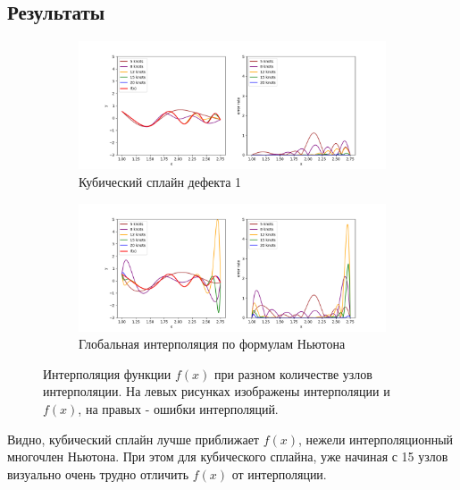 \documentclass[12pt]{article}%
\begin{document}
\newpage
\subsection{Результаты}
\begin{figure}[!h]
\centering
\begin{subfigure}{0.99\textwidth}
    \includegraphics[width=\textwidth]{task4_cubic-interp.png}
    \caption{Кубический сплайн дефекта 1}
\end{subfigure}
\hfill
\begin{subfigure}{0.99\textwidth}
    \includegraphics[width=\textwidth]{task4_global-interp.png}
    \caption{Глобальная интерполяция по формулам Ньютона}
\end{subfigure}

\caption{Интерполяция функции $f(x)$ при разном количестве узлов интерполяции. На левых рисунках изображены интерполяции и $f(x)$, на правых - ошибки интерполяций.}
\end{figure}

Видно, кубический сплайн лучше приближает $f(x)$, нежели интерполяционный многочлен Ньютона. При этом для кубического сплайна, уже начиная с 15 узлов визуально очень трудно отличить $f(x)$ от интерполяции.
\end{document}
